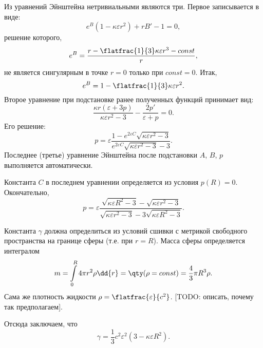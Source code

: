 \documentclass[\docroot/reports/draft/report.tex]{subfiles}
\begin{document}
    Из уравнений Эйнштейна нетривиальными являются три. Первое записывается в виде:
    \begin{equation}
        e^B (1 - \kappa \varepsilon r^2) + r B' - 1 = 0 ,
    \end{equation}
    решение которого,
    \begin{equation*}
        e^{B} = \frac{r - \flatfrac{1}{3} \kappa \varepsilon r^3 - const}{r} ,
    \end{equation*}
    не является сингулярным в точке $r = 0$ только при $const = 0$. Итак,
    \begin{equation*}
        e^{B} = 1 - \flatfrac{1}{3} \kappa \varepsilon r^2 .
    \end{equation*}
    Второе уравнение при подстановке ранее полученных функций принимает вид:
    \begin{equation}
        \frac{\kappa r (\varepsilon + 3 p)}{\kappa \varepsilon r^2 - 3} - \frac{2 p'}{\varepsilon + p} = 0 .
    \end{equation}
    Его решение:
    \begin{equation}
        p = \varepsilon \frac{1 - e^{2 \varepsilon C} \sqrt{\kappa \varepsilon r^2 - 3}}{e^{2 \varepsilon C} \sqrt{\kappa \varepsilon r^2 - 3} - 3} .
    \end{equation}
    Последнее (третье) уравнение Эйнштейна после подстановки $A$, $B$, $p$ выполняется автоматически.

    Константа $C$ в последнем уравнении определяется из условия $p(R) = 0$. Окончательно,
    \begin{equation}
        p = \varepsilon \frac{ \sqrt{\kappa \varepsilon R^2 - 3} - \sqrt{\kappa \varepsilon r^2 - 3}}{
            \sqrt{\kappa \varepsilon r^2 - 3} - 3 \sqrt{\kappa \varepsilon R^2 - 3}} .
    \end{equation}

    Константа $\gamma$ должна определиться из условий сшивки с метрикой свободного пространства на границе сферы (т.е. при $r = R$). Масса сферы определяется интегралом
    \begin{equation*}
        m = \int\limits_0^R 4 \pi r^2 \rho \dd{r} = \qty( \rho = const ) = \frac{4}{3} \pi R^3 \rho .
    \end{equation*}
    Сама же плотность жидкости $\rho = \flatfrac{\varepsilon}{c^2}$. [TODO: описать, почему так предполагаем].

    Отсюда заключаем, что
    \begin{equation}
        \gamma = \frac{1}{3} c^2 \varepsilon^2 (3 - \kappa \varepsilon R^2) .
    \end{equation}
\end{document}
